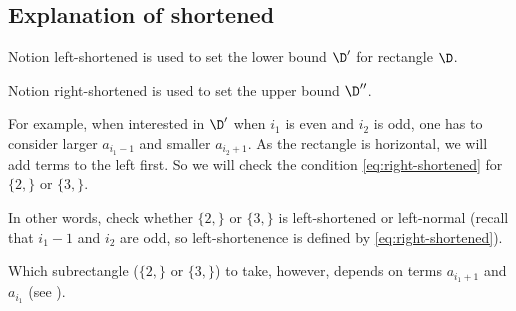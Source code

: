 \subsection{Explanation of shortened}
\label{sbsc:shortened_explanation}

Notion left-shortened is used to set the lower bound $\D'$ for rectangle $\D$.

Notion right-shortened is used to set the upper bound $\D''$.

For example, when interested in $\D'$ when $i_1$ is even and $i_2$ is odd,
one has to consider larger $a_{i_1 - 1}$ and smaller $a_{i_2 + 1}$.
As the rectangle is horizontal, we will add terms to the left first.
So we will check the condition \ref{eq:right-shortened} for $\{2,\}$ or $\{3,\}$.

In other words, check whether $\{2,\}$ or $\{3,\}$ is left-shortened or left-normal
(recall that $i_1 - 1$ and $i_2$ are odd, so left-shortenence is defined by \ref{eq:right-shortened}).

Which subrectangle ($\{2,\}$ or $\{3,\}$) to take, however,
depends on terms $a_{i_1 + 1}$ and $a_{i_1}$ (see ).
